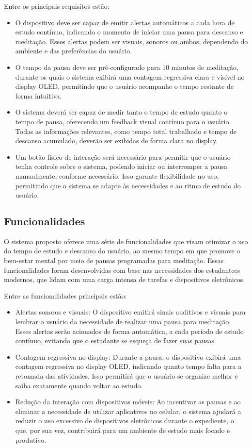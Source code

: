 \documentclass{article}
\begin{document}
Entre os principais requisitos estão: \begin{itemize} \item O dispositivo deve ser capaz de emitir alertas automáticos a cada hora de estudo contínuo, indicando o momento de iniciar uma pausa para descanso e meditação. Esses alertas podem ser visuais, sonoros ou ambos, dependendo do ambiente e das preferências do usuário. \item O tempo da pausa deve ser pré-configurado para 10 minutos de meditação, durante os quais o sistema exibirá uma contagem regressiva clara e visível no display OLED, permitindo que o usuário acompanhe o tempo restante de forma intuitiva. \item O sistema deverá ser capaz de medir tanto o tempo de estudo quanto o tempo de pausa, oferecendo um feedback visual contínuo para o usuário. Todas as informações relevantes, como tempo total trabalhado e tempo de descanso acumulado, deverão ser exibidas de forma clara no display. \item Um botão físico de interação será necessário para permitir que o usuário tenha controle sobre o sistema, podendo iniciar ou interromper a pausa manualmente, conforme necessário. Isso garante flexibilidade no uso, permitindo que o sistema se adapte às necessidades e ao ritmo de estudo do usuário. \end{itemize}

\subsection{Funcionalidades}

O sistema proposto oferece uma série de funcionalidades que visam otimizar o uso do tempo de estudo e descanso do usuário, ao mesmo tempo em que promove o bem-estar mental por meio de pausas programadas para meditação. Essas funcionalidades foram desenvolvidas com base nas necessidades dos estudantees modernos, que lidam com uma carga intensa de tarefas e dispositivos eletrônicos.

Entre as funcionalidades principais estão: \begin{itemize} \item Alertas sonoros e visuais: O dispositivo emitirá sinais auditivos e visuais para lembrar o usuário da necessidade de realizar uma pausa para meditação. Esses alertas serão acionados de forma automática, a cada período de estudo contínuo, evitando que o estudante se esqueça de fazer suas pausas. \item Contagem regressiva no display: Durante a pausa, o dispositivo exibirá uma contagem regressiva no display OLED, indicando quanto tempo falta para a retomada das atividades. Isso permitirá que o usuário se organize melhor e saiba exatamente quando voltar ao estudo. \item Redução da interação com dispositivos móveis: Ao incentivar as pausas e ao eliminar a necessidade de utilizar aplicativos no celular, o sistema ajudará a reduzir o uso excessivo de dispositivos eletrônicos durante o expediente, o que, por sua vez, contribuirá para um ambiente de estudo mais focado e produtivo. \end{itemize}
\end{document}
